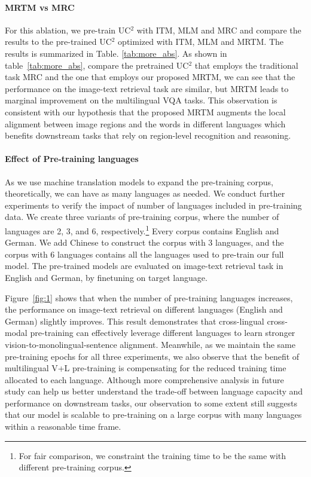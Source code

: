 \documentclass[final]{cvpr}
\newcommand{\jj}[1]{\textcolor{red}{\small{\bf [JJ: #1 ]}}}
\newcommand{\mingyang}[1]{\textcolor{brown}{\small{\bf [Mingyang: #1 ]}}}
\begin{document}
\paragraph{MRTM vs MRC}
For this ablation, we pre-train UC$^2$ with ITM, MLM and MRC and compare the results to the pre-trained UC$^2$ optimized with ITM, MLM and MRTM. The results is summarized in Table. \ref{tab:more_abs}. As shown in table~\ref{tab:more_abs}, compare the pretrained UC$^2$ that employs the traditional task MRC and the one that employs our proposed MRTM, we can see that the performance on the image-text retrieval task are similar, but MRTM leads to marginal improvement on the multilingual VQA tasks. This observation is consistent with our hypothesis that the proposed MRTM augments the local alignment between image regions and the words in different languages which benefits downstream tasks that rely on region-level recognition and reasoning. 

\paragraph{Effect of Pre-training languages}
As we use machine translation models to expand the pre-training corpus, theoretically, we can have as many languages as needed. We conduct further experiments to verify the impact of number of languages included in pre-training data. We create three variants of pre-training corpus, where the number of languages are 2, 3, and 6, respectively.\footnote{For fair comparison, we constraint the training time to be the same with different pre-training corpus.} Every corpus contains English and German. We add Chinese to construct the corpus with 3 languages, and the corpus with 6 languages contains all the languages used to pre-train our full model. The pre-trained models are evaluated on image-text retrieval task in English and German, by finetuning on target language.

Figure~\ref{fig:1} shows that when the number of pre-training languages increases, the performance on image-text retrieval on different languages (English and German)
slightly improves. This result demonstrates that cross-lingual cross-modal pre-training can effectively leverage different languages to learn stronger vision-to-monolingual-sentence alignment. Meanwhile, as we maintain the same pre-training epochs for all three experiments, we also observe that the benefit of multilingual V+L pre-training is compensating for the reduced training time allocated to each language. Although more comprehensive analysis in future study can help us better understand the trade-off between language capacity and performance on downstream tasks, our observation to some extent still suggests that our model is scalable to pre-training on a large corpus with many languages within a reasonable time frame.
\end{document}
